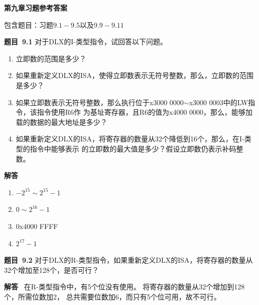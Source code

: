 \documentclass[10pt,a4paper,UTF8]{ctexart}
\newcommand{\problemname}{待定义}
\newenvironment{problem}{\begin{shaded}\par\noindent\textbf{题目\  \problemname}}{\end{shaded}\par}
\newenvironment{solution}{\par\noindent\textbf{解答}\ }{\par}
\begin{document}
\begin{center}
\LARGE\textbf{第九章习题参考答案}
\end{center}

{\kaishu 包含题目：习题$9.1-9.5$以及$9.9-9.11$}



	



\renewcommand{\problemname}{9.1}
\begin{problem}
	对于DLX的I-类型指令，试回答以下问题。
	\begin{enumerate}[(1)]
		\item 立即数的范围是多少？
		\item 如果重新定义DLX的ISA，使得立即数表示无符号整数，那么，立即数的范围是多少？
		\item 如果立即数表示无符号整数，那么执行位于x3000 0000$\sim$x3000 0003中的LW指令，该指令使用R6作
			  为基址寄存器，且R6的值为x4000 0000，那么，能够加载的数据的最大地址是多少？
		\item 如果重新定义DLX的ISA，将寄存器的数量从32个降低到16个，那么，在I-类型的指令中能够表示
		的立即数的最大值是多少？假设立即数仍表示补码整数。
	\end{enumerate}
\end{problem}

\begin{solution}
	\begin{enumerate}[(1)]
		\item $-2^{15}\sim 2^{15}-1$
		\item $0\sim 2^{16}-1$
		\item 0x4000 FFFF
		\item $2^{17}-1$
	\end{enumerate}

\end{solution}


\renewcommand{\problemname}{9.2}
\begin{problem}
	对于DLX的R-类型指令，如果重新定义DLX的ISA，将寄存器的数量从32个增加至128个，是否可行？
\end{problem}

\begin{solution}
	在R-类型指令中，有5个位没有使用。
	将寄存器的数量从32个增加到128个，所需位数加2，
	总共需要位数加6，而只有5个位可用，故不可行。
\end{solution}
\end{document}
